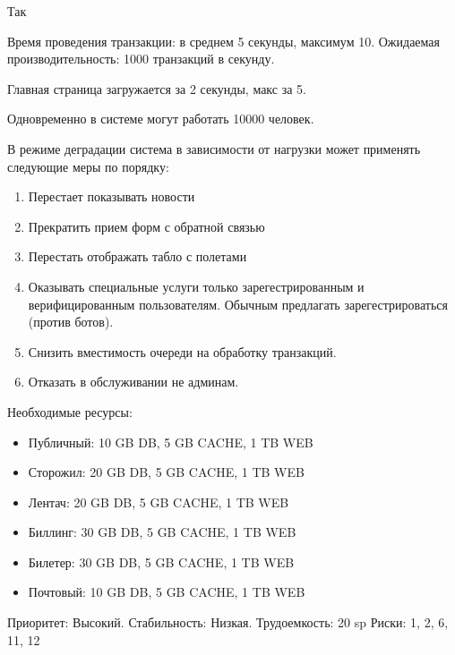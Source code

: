 Так

Время проведения транзакции: в среднем 5 секунды, максимум 10.
Ожидаемая производительность: 1000 транзакций в секунду.

Главная страница загружается за 2 секунды, макс за 5.

Одновременно в системе могут работать 10000 человек.

В режиме деградации система в зависимости от нагрузки
может применять следующие меры по порядку:
\begin{enumerate}
    \item Перестает показывать новости
    \item Прекратить прием форм с обратной связью
    \item Перестать отображать табло с полетами
    \item Оказывать специальные услуги только
          зарегестрированным и верифицированным
          пользователям. Обычным предлагать
          зарегестрироваться (против ботов).
    \item Снизить вместимость очереди на обработку
          транзакций.
    \item Отказать в обслуживании не админам.
\end{enumerate}

Необходимые ресурсы:
\begin{itemize}
    \item Публичный: 10 GB DB, 5 GB CACHE, 1 TB WEB
    \item Сторожил: 20 GB DB, 5 GB CACHE, 1 TB WEB
    \item Лентач: 20 GB DB, 5 GB CACHE, 1 TB WEB
    \item Биллинг: 30 GB DB, 5 GB CACHE, 1 TB WEB
    \item Билетер: 30 GB DB, 5 GB CACHE, 1 TB WEB
    \item Почтовый: 10 GB DB, 5 GB CACHE, 1 TB WEB
\end{itemize}

Приоритет: Высокий. Стабильность: Низкая. Трудоемкость: 20 sp
Риски: 1, 2, 6, 11, 12